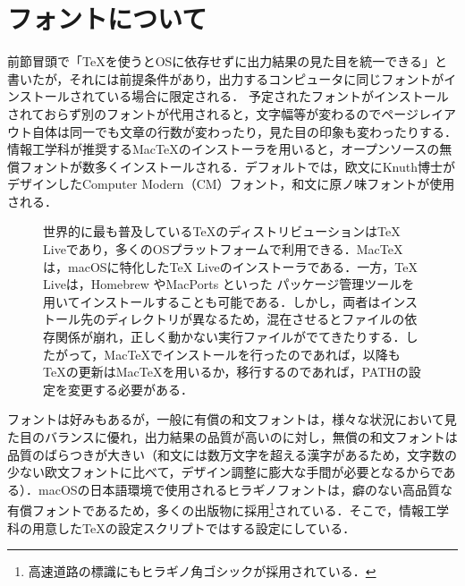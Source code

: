 \section{フォントについて}

前節冒頭で「{\TeX}を使うとOSに依存せずに出力結果の見た目を統一できる」と書いたが，それには前提条件があり，出力するコンピュータに同じフォントがインストールされている場合に限定される．
予定されたフォントがインストールされておらず別のフォントが代用されると，文字幅等が変わるのでページレイアウト自体は同一でも文章の行数が変わったり，見た目の印象も変わったりする．
情報工学科が推奨するMac{\TeX}\cite{mactex}のインストーラを用いると，オープンソースの無償フォントが数多くインストールされる．デフォルトでは，欧文にKnuth博士がデザインしたComputer Modern（CM）フォント\cite{cm}，和文に原ノ味フォント\cite{harano}が使用される．
\begin{figure}[b]
\begin{itembox}[l]{}
\small\sffamily\mgfamily
世界的に最も普及している{\TeX}のディストリビューションは{\TeX} Liveであり，多くのOSプラットフォームで利用できる．Mac{\TeX}は，macOSに特化した{\TeX} Liveのインストーラである．一方，{\TeX} Liveは，Homebrew \cite{homebrew}やMacPorts \cite{macports}といった
パッケージ管理ツールを用いてインストールすることも可能である．しかし，両者はインストール先のディレクトリが異なるため，混在させるとファイルの依存関係が崩れ，正しく動かない実行ファイルがでてきたりする．したがって，Mac{\TeX}でインストールを行ったのであれば，以降も{\TeX}の更新はMac{\TeX}を用いるか，移行するのであれば，PATHの設定を変更する必要がある．
\end{itembox}
\end{figure}

フォントは好みもあるが，一般に有償の和文フォントは，様々な状況において見た目のバランスに優れ，出力結果の品質が高いのに対し，無償の和文フォントは品質のばらつきが大きい（和文には数万文字を超える漢字があるため，文字数の少ない欧文フォントに比べて，デザイン調整に膨大な手間が必要となるからである）．macOSの日本語環境で使用されるヒラギノフォントは，癖のない高品質な有償フォントであるため，多くの出版物に採用\footnote{高速道路の標識にもヒラギノ角ゴシックが採用されている．}されている．そこで，情報工学科の用意した{\TeX}の設定スクリプトではする設定にしている．

